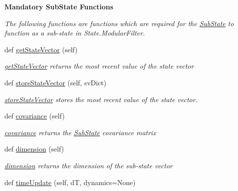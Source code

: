 \begin{Indent}{\bf Mandatory Sub\+State Functions}\par
{\em The following functions are functions which are required for the \hyperlink{classmodest_1_1substates_1_1substate_1_1SubState}{Sub\+State} to function as a sub-\/state in State.\+Modular\+Filter. }\begin{DoxyCompactItemize}
\item 
def \hyperlink{classmodest_1_1substates_1_1substate_1_1SubState_aa18c8238415131b4b63cef0e4b2ff9fd}{get\+State\+Vector} (self)
\begin{DoxyCompactList}\small\item\em \hyperlink{classmodest_1_1substates_1_1substate_1_1SubState_aa18c8238415131b4b63cef0e4b2ff9fd}{get\+State\+Vector} returns the most recent value of the state vector \end{DoxyCompactList}\item 
def \hyperlink{classmodest_1_1substates_1_1substate_1_1SubState_a3644149dc4cc19c0e32d0b7040998c96}{store\+State\+Vector} (self, sv\+Dict)
\begin{DoxyCompactList}\small\item\em \hyperlink{classmodest_1_1substates_1_1substate_1_1SubState_a3644149dc4cc19c0e32d0b7040998c96}{store\+State\+Vector} stores the most recent value of the state vector. \end{DoxyCompactList}\item 
def \hyperlink{classmodest_1_1substates_1_1substate_1_1SubState_a6e308aadd13962e476d2892ec728e3a5}{covariance} (self)
\begin{DoxyCompactList}\small\item\em \hyperlink{classmodest_1_1substates_1_1substate_1_1SubState_a6e308aadd13962e476d2892ec728e3a5}{covariance} returns the \hyperlink{classmodest_1_1substates_1_1substate_1_1SubState}{Sub\+State} covariance matrix \end{DoxyCompactList}\item 
def \hyperlink{classmodest_1_1substates_1_1substate_1_1SubState_ab9027f6d1d7d57c47731612f519b7ee6}{dimension} (self)
\begin{DoxyCompactList}\small\item\em \hyperlink{classmodest_1_1substates_1_1substate_1_1SubState_ab9027f6d1d7d57c47731612f519b7ee6}{dimension} returns the dimension of the sub-\/state vector \end{DoxyCompactList}\item 
def \hyperlink{classmodest_1_1substates_1_1substate_1_1SubState_a06d147fa5babe4e147b3267e67054ab4}{time\+Update} (self, dT, dynamics=None)

\end{DoxyCompactItemize}
\end{Indent}
